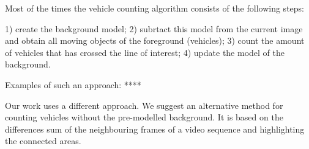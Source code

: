 \documentclass[12pt,a4paper,oneside,titlepage]{article}
\begin{document}
Most of the times the vehicle counting algorithm consists of the following steps:

1) create the background model;
2) subrtact this model from the current image and obtain all moving objects of the foreground (vehicles);
3) count the amount of vehicles that has crossed the line of interest;
4) update the model of the background.

Examples of such an approach: ****\

Our work uses a different approach. We suggest an alternative method for counting vehicles without the pre-modelled background.
It is based on the differences sum  of the neighbouring frames of a video sequence and highlighting the connected areas.



























\newpage
\end{document}
